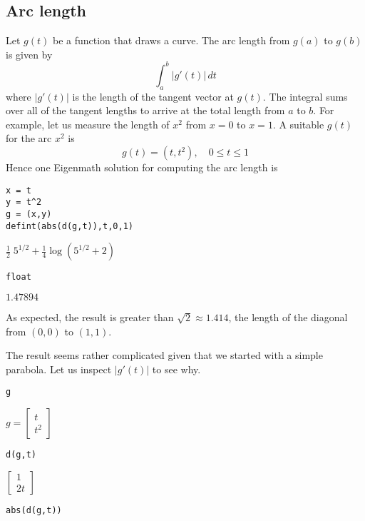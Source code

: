 \subsection{Arc length}

Let $g(t)$ be a function that draws a curve.
The arc length from $g(a)$ to $g(b)$ is given by
$$\int_a^b|g'(t)|\,dt$$
where $|g'(t)|$ is the length of the tangent vector at $g(t)$.
The integral sums over all of the tangent lengths to arrive at the total length
from $a$ to $b$.
For example, let us measure the length of $x^2$ from $x=0$ to $x=1$.
A suitable $g(t)$ for the arc $x^2$ is
$$g(t)=(t,t^2),\quad0\le t\le1$$
Hence one Eigenmath solution for computing the arc length is

{\color{blue}
\begin{verbatim}
x = t
y = t^2
g = (x,y)
defint(abs(d(g,t)),t,0,1)
\end{verbatim}
}

\noindent
$\displaystyle \tfrac{1}{2}\;5^{1/2}+\tfrac{1}{4}\log(5^{1/2}+2)$

{\color{blue}
\begin{verbatim}
float
\end{verbatim}
}

\noindent
$\displaystyle 1.47894$

\bigskip
\noindent
As expected, the result is greater than $\sqrt2\approx1.414$,
the length of the
diagonal from $(0,0)$ to $(1,1)$.

\bigskip
\noindent
The result seems rather complicated given that we
started with a simple parabola.
Let us inspect $|g'(t)|$ to see why.

{\color{blue}
\begin{verbatim}
g
\end{verbatim}
}

\noindent
$\displaystyle
g=
\begin{bmatrix}
t
\\[1ex]
t^2
\end{bmatrix}
$

{\color{blue}
\begin{verbatim}
d(g,t)
\end{verbatim}
}

\noindent
$\displaystyle
\begin{bmatrix}
1
\\[1ex]
2t
\end{bmatrix}
$

{\color{blue}
\begin{verbatim}
abs(d(g,t))
\end{verbatim}
}

